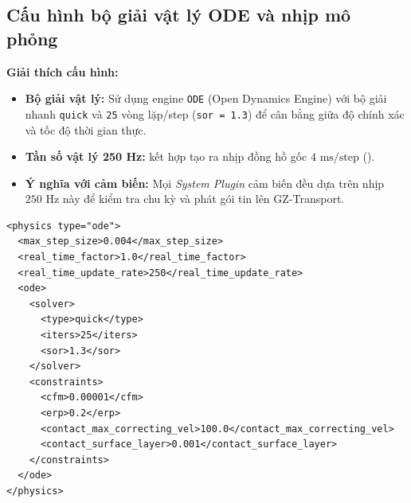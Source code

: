 \documentclass[11pt,a4paper]{article}
\begin{document}
\subsection{Cấu hình bộ giải vật lý ODE và nhịp mô phỏng}
\noindent
\begin{minipage}[t]{0.45\textwidth}
\vspace{0pt}
\textbf{Giải thích cấu hình:}
\begin{itemize}
    \item \textbf{Bộ giải vật lý:} Sử dụng engine \texttt{ODE} (Open Dynamics Engine) với bộ giải nhanh \texttt{quick} và \texttt{25} vòng lặp/step (\texttt{sor = 1.3}) để cân bằng giữa độ chính xác và tốc độ thời gian thực.
    \item \textbf{Tần số vật lý 250 Hz:}  kết hợp  tạo ra nhịp đồng hồ gốc $4\text{ ms/step}$ ().
    \item \textbf{Ý nghĩa với cảm biến:} Mọi \emph{System Plugin} cảm biến đều dựa trên nhịp $250\text{ Hz}$ này để kiểm tra chu kỳ  và phát gói tin lên GZ-Transport.
\end{itemize}
\end{minipage}
\hfill
\begin{minipage}[t]{0.52\textwidth}
\vspace{0pt}
\begin{lstlisting}[language=SDF, firstnumber=5]
<physics type="ode">
  <max_step_size>0.004</max_step_size>
  <real_time_factor>1.0</real_time_factor>
  <real_time_update_rate>250</real_time_update_rate>
  <ode>
    <solver>
      <type>quick</type>
      <iters>25</iters>
      <sor>1.3</sor>
    </solver>
    <constraints>
      <cfm>0.00001</cfm>
      <erp>0.2</erp>
      <contact_max_correcting_vel>100.0</contact_max_correcting_vel>
      <contact_surface_layer>0.001</contact_surface_layer>
    </constraints>
  </ode>
</physics>
\end{lstlisting}
\end{minipage}

\vspace{1em}
\end{document}
